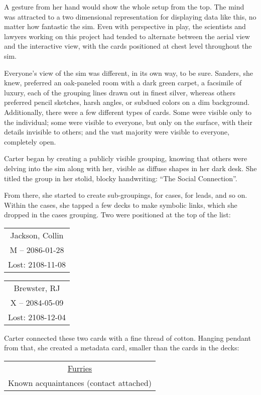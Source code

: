 A gesture from her hand would show the whole setup from the top. The mind was attracted to a two dimensional representation for displaying data like this, no matter how fantastic the sim. Even with perspective in play, the scientists and lawyers working on this project had tended to alternate between the aerial view and the interactive view, with the cards positioned at chest level throughout the sim.

Everyone's view of the sim was different, in its own way, to be sure. Sanders, she knew, preferred an oak-paneled room with a dark green carpet, a facsimile of luxury, each of the grouping lines drawn out in finest silver, whereas others preferred pencil sketches, harsh angles, or subdued colors on a dim background. Additionally, there were a few different types of cards. Some were visible only to the individual; some were visible to everyone, but only on the surface, with their details invisible to others; and the vast majority were visible to everyone, completely open.

Carter began by creating a publicly visible grouping, knowing that others were delving into the sim along with her, visible as diffuse shapes in her dark desk. She titled the group in her stolid, blocky handwriting: ``The Social Connection''.

From there, she started to create sub-groupings, for cases, for leads, and so on. Within the cases, she tapped a few decks to make symbolic links, which she dropped in the cases grouping. Two were positioned at the top of the list:

\begin{tabular}{|c|}
  \hline
  Jackson, Collin\\
  M -- 2086-01-28\\
  Lost: 2108-11-08\\
  \hline
\end{tabular}
\begin{tabular}{|c|}
  \hline
  Brewster, RJ\\
  X -- 2084-05-09\\
  Lost: 2108-12-04\\
  \hline
\end{tabular}

Carter connected these two cards with a fine thread of cotton. Hanging pendant from that, she created a metadata card, smaller than the cards in the decks:

\begin{tabular}{|c|}
  \hline
  \underline{Furries}\\
  Known acquaintances (contact attached)\\
  \hline
\end{tabular}

